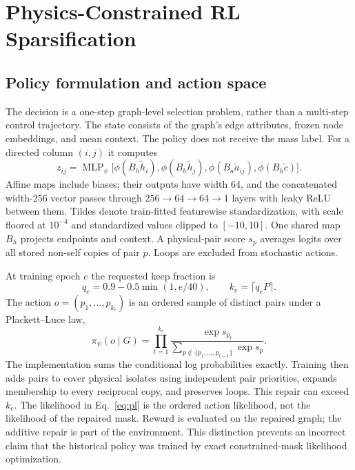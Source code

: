 \section{Physics-Constrained RL Sparsification}
\label{sec:method}
\subsection{Policy formulation and action space}
The decision is a one-step graph-level selection problem, rather than a multi-step control trajectory. The state consists of the graph's edge attributes, frozen node embeddings, and mean context. The policy does not receive the mass label. For a directed column $(i,j)$ it computes
\begin{equation}
 z_{ij}=\operatorname{MLP}_{\psi}
 \bigl[\phi(B_h\tilde h_i),\phi(B_h\tilde h_j),
       \phi(B_a\tilde a_{ij}),\phi(B_h\tilde c)\bigr].
\end{equation}
Affine maps include biases; their outputs have width 64, and the concatenated width-256 vector passes through $256\to64\to64\to1$ layers with leaky ReLU between them. Tildes denote train-fitted featurewise standardization, with scale floored at $10^{-4}$ and standardized values clipped to $[-10,10]$. One shared map $B_h$ projects endpoints and context. A physical-pair score $s_p$ averages logits over all stored non-self copies of pair $p$. Loops are excluded from stochastic actions.

At training epoch $e$ the requested keep fraction is
\begin{equation}
 q_e=0.9-0.5\min(1,e/40),\qquad k_e=\lceil q_eP\rceil.
\end{equation}
The action $o=(p_1,\ldots,p_{k_e})$ is an ordered sample of distinct pairs under a Plackett--Luce law,
\begin{equation}
 \pi_\psi(o\mid G)=\prod_{t=1}^{k_e}
 \frac{\exp s_{p_t}}{\sum_{p\notin\{p_1,\ldots,p_{t-1}\}}\exp s_p}.
 \label{eq:pl}
\end{equation}
The implementation sums the conditional log probabilities exactly. Training then adds pairs to cover physical isolates using independent pair priorities, expands membership to every reciprocal copy, and preserves loops. This repair can exceed $k_e$. The likelihood in Eq.~\ref{eq:pl} is the ordered action likelihood, not the likelihood of the repaired mask. Reward is evaluated on the repaired graph; the additive repair is part of the environment. This distinction prevents an incorrect claim that the historical policy was trained by exact constrained-mask likelihood optimization.

